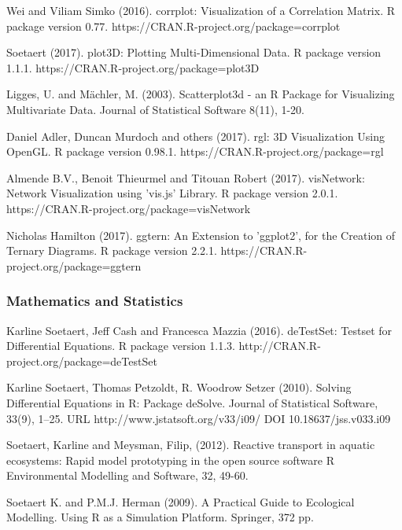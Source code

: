\begin{thebibliography}{00}
	 Wei and Viliam Simko (2016).
	\newblock corrplot: Visualization of a Correlation Matrix. 
	\newblock R package version 0.77. https://CRAN.R-project.org/package=corrplot
	
	 Soetaert (2017). 
	\newblock plot3D: Plotting Multi-Dimensional Data. 
	\newblock R package version 1.1.1. https://CRAN.R-project.org/package=plot3D
	
	 Ligges, U. and Mächler, M. (2003).
	\newblock Scatterplot3d - an R Package for Visualizing Multivariate Data.
	\newblock Journal of Statistical Software 8(11), 1-20.
	
	Daniel Adler, Duncan Murdoch and others (2017). 
	\newblock rgl: 3D Visualization Using OpenGL. 
	\newblock R package version 0.98.1. https://CRAN.R-project.org/package=rgl
	
	 Almende B.V., Benoit Thieurmel and Titouan Robert (2017). visNetwork:
	\newblock Network Visualization using 'vis.js' Library. R package version 2.0.1.
	\newblock https://CRAN.R-project.org/package=visNetwork
	
	 Nicholas Hamilton (2017). 
	\newblock ggtern: An Extension to 'ggplot2', for the Creation of Ternary Diagrams. 
	\newblock R package version 2.2.1. https://CRAN.R-project.org/package=ggtern
	
\subsubsection{Mathematics and Statistics}
	
	 Karline Soetaert, Jeff Cash and Francesca Mazzia (2016). 
	\newblock deTestSet: Testset for Differential Equations. R package version 1.1.3.
	\newblock http://CRAN.R-project.org/package=deTestSet
	
	Karline Soetaert, Thomas Petzoldt, R. Woodrow Setzer (2010). 
	\newblock Solving Differential Equations in R: Package deSolve. 
	\newblock Journal of Statistical Software, 33(9), 1--25. URL http://www.jstatsoft.org/v33/i09/ DOI 10.18637/jss.v033.i09
	
	Soetaert, Karline and Meysman, Filip, (2012).
	\newblock Reactive transport in aquatic ecosystems: Rapid model prototyping in the open source software R
	\newblock Environmental Modelling and Software, 32, 49-60.
	
	Soetaert K. and P.M.J. Herman (2009).  
	\newblock A Practical Guide to Ecological Modelling. 
	\newblock Using R as a Simulation Platform.  Springer, 372 pp.
	

\end{thebibliography}
